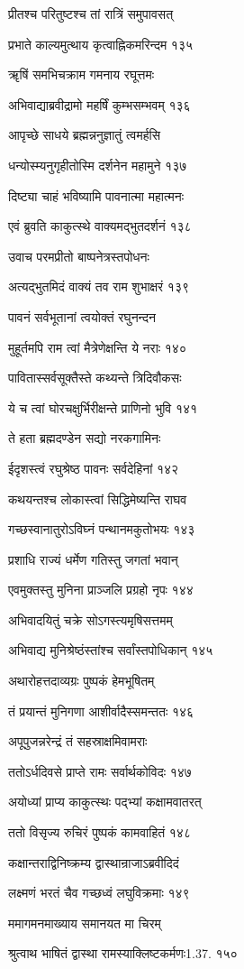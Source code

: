 प्रीतश्च परितुष्टश्च तां रात्रिं समुपावसत्

प्रभाते काल्यमुत्थाय कृत्वाह्निकमरिन्दम १३५

ॠषिं समभिचक्राम गमनाय रघूत्तमः

अभिवाद्याब्रवीद्रामो महर्षिं कुम्भसम्भवम् १३६

आपृच्छे साधये ब्रह्मन्ननुज्ञातुं त्वमर्हसि

धन्योस्म्यनुगृहीतोस्मि दर्शनेन महामुने १३७

दिष्ट्या चाहं भविष्यामि पावनात्मा महात्मनः

एवं ब्रुवति काकुत्स्थे वाक्यमद्भुतदर्शनं १३८

उवाच परमप्रीतो बाष्पनेत्रस्तपोधनः

अत्यद्भुतमिदं वाक्यं तव राम शुभाक्षरं १३९

पावनं सर्वभूतानां त्वयोक्तं रघुनन्दन

मुहूर्तमपि राम त्वां मैत्रेणेक्षन्ति ये नराः १४०

पावितास्सर्वसूक्तैस्ते कथ्यन्ते त्रिदिवौकसः

ये च त्वां घोरचक्षुर्भिरीक्षन्ते प्राणिनो भुवि १४१

ते हता ब्रह्मदण्डेन सद्यो नरकगामिनः

ईदृशस्त्वं रघुश्रेष्ठ पावनः सर्वदेहिनां १४२

कथयन्तश्च लोकास्त्वां सिद्धिमेष्यन्ति राघव

गच्छस्वानातुरोऽविघ्नं पन्थानमकुतोभयः १४३

प्रशाधि राज्यं धर्मेण गतिस्तु जगतां भवान्

एवमुक्तस्तु मुनिना प्राञ्जलि प्रग्रहो नृपः १४४

अभिवादयितुं चक्रे सोऽगस्त्यमृषिसत्तमम्

अभिवाद्य मुनिश्रेष्ठंस्तांश्च सर्वांस्तपोधिकान् १४५

अथारोहत्तदाव्यग्रः पुष्पकं हेमभूषितम्

तं प्रयान्तं मुनिगणा आशीर्वादैस्समन्ततः १४६

अपूपुजन्नरेन्द्रं तं सहस्राक्षमिवामराः

ततोऽर्धदिवसे प्राप्ते रामः सर्वार्थकोविदः १४७

अयोध्यां प्राप्य काकुत्स्थः पद्भ्यां कक्षामवातरत्

ततो विसृज्य रुचिरं पुष्पकं कामवाहितं १४८

कक्षान्तराद्विनिष्क्रम्य द्वास्थान्राजाऽब्रवीदिदं

लक्ष्मणं भरतं चैव गच्छध्वं लघुविक्रमाः १४९

ममागमनमाख्याय समानयत मा चिरम्

श्रुत्वाथ भाषितं द्वास्था रामस्याक्लिष्टकर्मणः1.37. १५०

